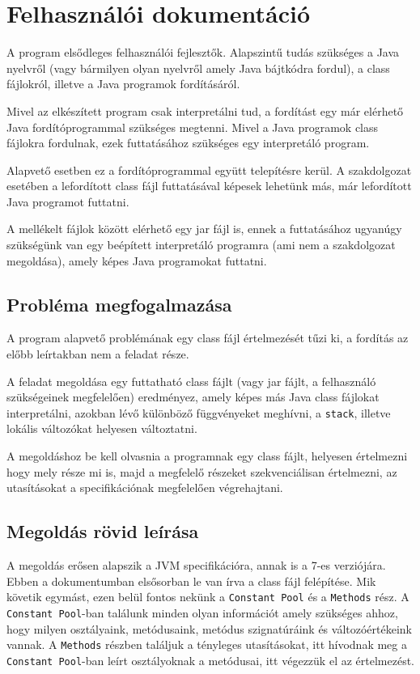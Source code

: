 \chapter{Felhasználói dokumentáció}
\label{ch:user}

A program elsődleges felhasználói fejlesztők. Alapszintű tudás szükséges a Java nyelvről (vagy bármilyen olyan nyelvről amely Java bájtkódra fordul), a class fájlokról, illetve a Java programok fordításáról.

Mivel az elkészített program csak interpretálni tud, a fordítást egy már elérhető Java fordítóprogrammal szükséges megtenni. Mivel a Java programok class fájlokra fordulnak, ezek futtatásához szükséges egy interpretáló program.

Alapvető esetben ez a fordítóprogrammal együtt telepítésre kerül. A szakdolgozat esetében a lefordított class fájl futtatásával képesek lehetünk más, már lefordított Java programot futtatni.

A mellékelt fájlok között elérhető egy jar fájl is, ennek a futtatásához ugyanúgy szükségünk van egy beépített interpretáló programra (ami nem a szakdolgozat megoldása), amely képes Java programokat futtatni.

\section{Probléma megfogalmazása}

A program alapvető problémának egy class fájl értelmezését tűzi ki, a fordítás az előbb leírtakban nem a feladat része. 

A feladat megoldása egy futtatható class fájlt (vagy jar fájlt, a felhasználó szükségeinek megfelelően) eredményez, amely képes más Java class fájlokat interpretálni, azokban lévő különböző függvényeket meghívni, a \lstinline{stack}, illetve lokális változókat helyesen változtatni.

A megoldáshoz be kell olvasnia a programnak egy class fájlt, helyesen értelmezni hogy mely része mi is, majd a megfelelő részeket szekvenciálisan értelmezni, az utasításokat a specifikációnak megfelelően végrehajtani. 

\section{Megoldás rövid leírása}

A megoldás erősen alapszik a JVM specifikációra, annak is a 7-es verziójára. Ebben a dokumentumban elsősorban le van írva a class fájl felépítése. Mik követik egymást, ezen belül fontos nekünk a \lstinline{Constant Pool} és a \lstinline{Methods} rész. A \lstinline{Constant Pool}-ban találunk minden olyan információt amely szükséges ahhoz, hogy milyen osztályaink, metódusaink, metódus szignatúráink és változóértékeink vannak. A \lstinline{Methods} részben találjuk a tényleges utasításokat, itt hívodnak meg a \lstinline{Constant Pool}-ban leírt osztályoknak a metódusai, itt végezzük el az értelmezést.

